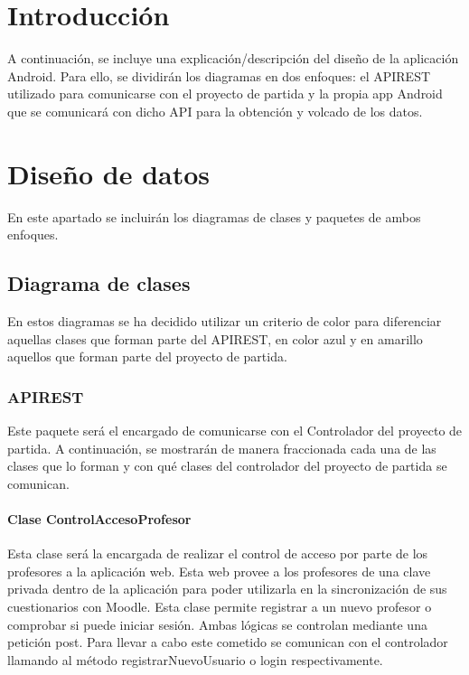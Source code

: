 
\section{Introducción}

A continuación, se incluye una explicación/descripción del diseño de la aplicación Android. Para ello, se dividirán los diagramas en dos enfoques: el APIREST utilizado para comunicarse con el proyecto de partida y la propia app Android que se comunicará con dicho API para la obtención y volcado de los datos.

\section{Diseño de datos}

En este apartado se incluirán los diagramas de clases y paquetes de ambos enfoques.

\subsection{Diagrama de clases}

En estos diagramas se ha decidido utilizar un criterio de color para diferenciar aquellas clases que forman parte del APIREST, en color azul y en amarillo aquellos que forman parte del proyecto de partida.

\subsubsection{APIREST}

Este paquete será el encargado de comunicarse con el Controlador del proyecto de partida. A continuación, se mostrarán de manera fraccionada cada una de las clases que lo forman y con qué clases del controlador del proyecto de partida se comunican.

\paragraph{Clase ControlAccesoProfesor}

Esta clase será la encargada de realizar el control de acceso por parte de los profesores a la aplicación web. Esta web provee a los profesores de una clave privada dentro de la aplicación para poder utilizarla en la sincronización de sus cuestionarios con Moodle. Esta clase permite registrar a un nuevo profesor o comprobar si puede iniciar sesión. Ambas lógicas se controlan mediante una petición post. Para llevar a cabo este cometido se comunican con el controlador llamando al método registrarNuevoUsuario o login respectivamente.

